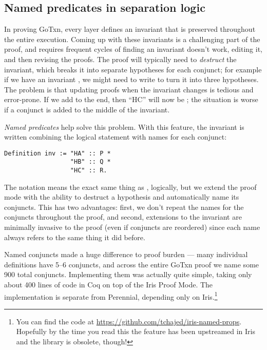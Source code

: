 \subsection{Named predicates in separation logic}

In proving GoTxn, every layer defines an invariant that is preserved throughout
the entire execution. Coming up with these invariants is a challenging part of
the proof, and requires frequent cycles of finding an invariant doesn't work,
editing it, and then revising the proofs. The proof will typically need to
\emph{destruct} the invariant, which breaks it into separate hypotheses for each
conjunct; for example if we have an invariant , we might
need to write  to turn it into three
hypotheses. The problem is that updating proofs when the invariant changes is
tedious and error-prone. If we add  to the end, then ``HC'' will now be
; the situation is worse if a conjunct is added to the middle of the
invariant.

\emph{Named predicates} help solve this problem. With this feature, the
invariant is written combining the logical statement with names for each conjunct:
\begin{verbatim}
Definition inv := "HA" :: P *
                  "HB" :: Q *
                  "HC" :: R.
\end{verbatim}
The notation  means the exact same thing as , logically, but
we extend the proof mode with the ability to destruct a hypothesis and
automatically name its conjuncts. This has two advantages: first, we don't repeat
the names for the conjuncts throughout the proof, and second, extensions to the
invariant are minimally invasive to the proof (even if conjuncts are reordered)
since each name always refers to the same thing it did before.

Named conjuncts made a huge difference to proof burden --- many individual
definitions have 5--6 conjuncts, and across the entire GoTxn proof we name some
900 total conjuncts. Implementing them was actually quite simple, taking only
about 400 lines of code in Coq on top of the Iris Proof Mode. The implementation
is separate from Perennial, depending only on Iris.\footnote{You can find the
code at \url{https://github.com/tchajed/iris-named-props}. Hopefully by the time
you read this the feature has been upstreamed in Iris and the library is
obsolete, though!}


